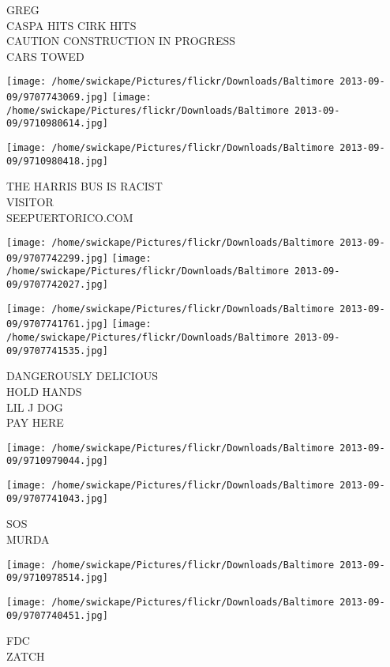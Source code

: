\documentclass[10pt,letterpaper]{article}
\begin{document}
GREG\\
CASPA HITS CIRK HITS\\
CAUTION CONSTRUCTION IN PROGRESS\\
CARS TOWED
\pagebreak

\texttt{[image: /home/swickape/Pictures/flickr/Downloads/Baltimore 2013-09-09/9707743069.jpg]}
\texttt{[image: /home/swickape/Pictures/flickr/Downloads/Baltimore 2013-09-09/9710980614.jpg]}

\vspace{0.25in}
\texttt{[image: /home/swickape/Pictures/flickr/Downloads/Baltimore 2013-09-09/9710980418.jpg]}

THE HARRIS BUS IS RACIST\\
VISITOR\\
SEEPUERTORICO.COM
\pagebreak

\texttt{[image: /home/swickape/Pictures/flickr/Downloads/Baltimore 2013-09-09/9707742299.jpg]}
\texttt{[image: /home/swickape/Pictures/flickr/Downloads/Baltimore 2013-09-09/9707742027.jpg]}

\texttt{[image: /home/swickape/Pictures/flickr/Downloads/Baltimore 2013-09-09/9707741761.jpg]}
\texttt{[image: /home/swickape/Pictures/flickr/Downloads/Baltimore 2013-09-09/9707741535.jpg]}

DANGEROUSLY DELICIOUS\\
HOLD HANDS\\
LIL J DOG\\
PAY HERE
\pagebreak

\texttt{[image: /home/swickape/Pictures/flickr/Downloads/Baltimore 2013-09-09/9710979044.jpg]}

\vspace{0.25in}
\texttt{[image: /home/swickape/Pictures/flickr/Downloads/Baltimore 2013-09-09/9707741043.jpg]}

SOS\\
MURDA
\pagebreak

\texttt{[image: /home/swickape/Pictures/flickr/Downloads/Baltimore 2013-09-09/9710978514.jpg]}

\vspace{0.25in}
\texttt{[image: /home/swickape/Pictures/flickr/Downloads/Baltimore 2013-09-09/9707740451.jpg]}

FDC\\
ZATCH
\pagebreak
\end{document}
